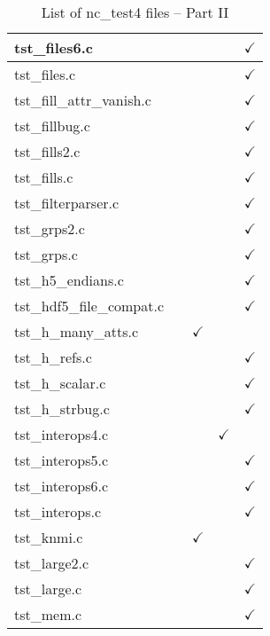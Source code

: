 \begin{table}[H]
\begin{tabular}{|l|c|c|c|c|}
tst\_files6.c   &  &   &   & $\checkmark$    \\ \hline
tst\_files.c   &  &   &   & $\checkmark$    \\ \hline
tst\_fill\_attr\_vanish.c   &  &   &   & $\checkmark$    \\ \hline
tst\_fillbug.c   &  &   &   & $\checkmark$    \\ \hline
tst\_fills2.c   &  &   &   & $\checkmark$    \\ \hline
tst\_fills.c   &  &   &   & $\checkmark$    \\ \hline
tst\_filterparser.c   &  &   &   & $\checkmark$    \\ \hline
tst\_grps2.c   &  &   &   & $\checkmark$    \\ \hline
tst\_grps.c   &  &   &   & $\checkmark$    \\ \hline
tst\_h5\_endians.c   &  &   &   & $\checkmark$    \\ \hline
tst\_hdf5\_file\_compat.c   &  &   &   & $\checkmark$    \\ \hline
tst\_h\_many\_atts.c   &  & $\checkmark$  &   &    \\ \hline
tst\_h\_refs.c   &  &   &   & $\checkmark$    \\ \hline
tst\_h\_scalar.c   &  &   &   & $\checkmark$    \\ \hline
tst\_h\_strbug.c   &  &   &   & $\checkmark$    \\ \hline
tst\_interops4.c   &  &   &  $\checkmark$ &    \\ \hline
tst\_interops5.c   &  &   &   & $\checkmark$    \\ \hline
tst\_interops6.c   &  &   &   & $\checkmark$    \\ \hline
tst\_interops.c   &  &   &   & $\checkmark$    \\ \hline
tst\_knmi.c   &  & $\checkmark$  &   &    \\ \hline
tst\_large2.c   &  &   &   & $\checkmark$    \\ \hline
tst\_large.c   &  &   &   & $\checkmark$    \\ \hline
tst\_mem.c   &  &   &   & $\checkmark$    \\ \hline
\hline
\end{tabular}
\caption{\label{tab:nc_test4_2} List of nc\_test4 files -- Part II}
\end{table}

